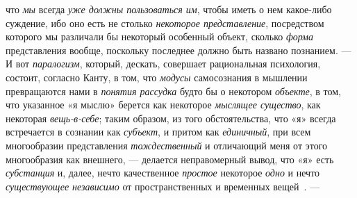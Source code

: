 \documentclass[twoside]{article}
\begin{document}
{{что {\em мы}
всегда {\em уже должны
пользоваться им}, чтобы иметь о нем какое-либо суждение, ибо
оно есть не столько {\em некоторое
представление}, посредством которого мы различали бы
некоторый особенный объект, сколько
{\em форма} представления
вообще, поскольку последнее должно быть названо познанием. —
И вот {\em паралогизм},
который, дескать, совершает рациональная психология, состоит,
согласно Канту, в том, что {\em модусы}
самосознания в мышлении превращаются нами в
{\em понятия рассудка}
будто бы о некотором
{\em объекте}, в том, что
указанное «я мыслю» берется как некоторое
{\em мыслящее существо},
как некоторая
{\em вещь-в-себе}; таким
образом, из того обстоятельства, что «я» всегда встречается в сознании
как {\em субъект},
и притом как
{\em единичный}, при всем
многообразии представления
{\em тождественный} и
отличающий меня от этого многообразия как внешнего, —
делается неправомерный вывод, что «я» есть
{\em субстанция} и,
далее, нечто качественное {\em простое}
некоторое {\em одно}
и нечто {\em существующее
независимо} от пространственных и временных
вещей~\label{bkm:bm96}.
—}

}
\end{document}
